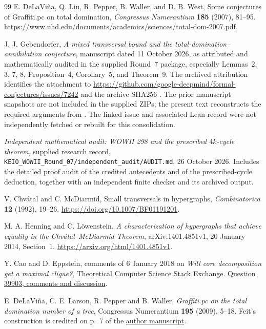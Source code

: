 \documentclass[11pt,a4paper]{article}
\theoremstyle{definition}\newtheorem{definition}[theorem]{Definition}
\theoremstyle{remark}\newtheorem{remark}[theorem]{Remark}
\begin{document}
\begin{thebibliography}{99}
E. DeLaVi\~na, Q. Liu, R. Pepper, B. Waller, and D. B. West,
Some conjectures of Graffiti.pc on total domination,
\emph{Congressus Numerantium} \textbf{185} (2007), 81--95.
\url{https://www.uhd.edu/documents/academics/sciences/total-dom-2007.pdf}.

J. J. Gebendorfer,
\emph{A mixed transversal bound and the total-domination--annihilation
conjecture}, manuscript dated 11 October 2026, as attributed and
mathematically audited in the supplied Round~7 package, especially
Lemmas~2, 3, 7, 8, Proposition~4, Corollary~5, and Theorem~9.
The archived attribution identifies the attachment to
\url{https://github.com/google-deepmind/formal-conjectures/issues/7242}
and the archive SHA256
.
The prior manuscript snapshots are not included in the supplied ZIPs;
the present text reconstructs the required arguments from
\cite{early:298-audit}.  The linked issue and associated Lean record
were not independently fetched or rebuilt for this consolidation.

\emph{Independent mathematical audit: WOWII 298 and the prescribed
$4k$-cycle theorem}, supplied research record,
\texttt{KEIO\_WOWII\_Round\_07/independent\_audit/AUDIT.md},
26 October 2026.  Includes the detailed proof audit of the credited
antecedents and of the prescribed-cycle deduction, together with
an independent finite checker and its archived output.

V. Chv\'atal and C. McDiarmid,
Small transversals in hypergraphs,
\emph{Combinatorica} \textbf{12} (1992), 19--26.
\url{https://doi.org/10.1007/BF01191201}.

M. A. Henning and C. L\"owenstein,
\emph{A characterization of hypergraphs that achieve equality in the
Chv\'atal--McDiarmid Theorem}, arXiv:1401.4851v1, 20 January 2014,
Section~1.
\url{https://arxiv.org/html/1401.4851v1}.

Y. Cao and D. Eppstein, comments of 6 January 2018 on
\emph{Will core decomposition get a maximal clique?}, Theoretical Computer
Science Stack Exchange.
\href{https://cstheory.stackexchange.com/questions/39903/will-core-decomposition-get-a-maximal-clique}{Question 39903, comments and discussion}.

E. DeLaVi\~na, C. E. Larson, R. Pepper and B. Waller,
\emph{Graffiti.pc on the total domination number of a tree},
Congressus Numerantium \textbf{195} (2009), 5--18.
Feit's construction is credited on p.~7 of the
\href{https://www.uhd.edu/documents/academics/sciences/boca2009-dlpw.pdf}{author manuscript}.


\end{thebibliography}
\end{document}
